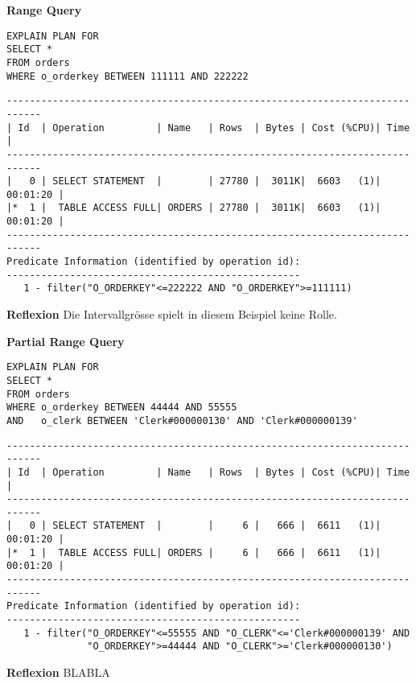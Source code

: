 \documentclass[10pt]{article}
\begin{document}
\textbf{Range Query}
\begin{lstlisting}[style=sqlNoTitle]
EXPLAIN PLAN FOR
SELECT *
FROM orders
WHERE o_orderkey BETWEEN 111111 AND 222222
\end{lstlisting}
\begin{lstlisting}[style=queryexecutionplan]
----------------------------------------------------------------------------
| Id  | Operation         | Name   | Rows  | Bytes | Cost (%CPU)| Time     |
----------------------------------------------------------------------------
|   0 | SELECT STATEMENT  |        | 27780 |  3011K|  6603   (1)| 00:01:20 |
|*  1 |  TABLE ACCESS FULL| ORDERS | 27780 |  3011K|  6603   (1)| 00:01:20 |
----------------------------------------------------------------------------
Predicate Information (identified by operation id):
---------------------------------------------------
   1 - filter("O_ORDERKEY"<=222222 AND "O_ORDERKEY">=111111)
\end{lstlisting}
\textbf{Reflexion} \newline
Die Intervallgrösse spielt in diesem Beispiel keine Rolle.

\textbf{Partial Range Query}
\begin{lstlisting}[style=sqlNoTitle]
EXPLAIN PLAN FOR
SELECT *
FROM orders
WHERE o_orderkey BETWEEN 44444 AND 55555
AND   o_clerk BETWEEN 'Clerk#000000130' AND 'Clerk#000000139'
\end{lstlisting}
\begin{lstlisting}[style=queryexecutionplan]
----------------------------------------------------------------------------
| Id  | Operation         | Name   | Rows  | Bytes | Cost (%CPU)| Time     |
----------------------------------------------------------------------------
|   0 | SELECT STATEMENT  |        |     6 |   666 |  6611   (1)| 00:01:20 |
|*  1 |  TABLE ACCESS FULL| ORDERS |     6 |   666 |  6611   (1)| 00:01:20 |
----------------------------------------------------------------------------
Predicate Information (identified by operation id):
---------------------------------------------------
   1 - filter("O_ORDERKEY"<=55555 AND "O_CLERK"<='Clerk#000000139' AND 
              "O_ORDERKEY">=44444 AND "O_CLERK">='Clerk#000000130')
\end{lstlisting}
\textbf{Reflexion} \newline
BLABLA
\end{document}

